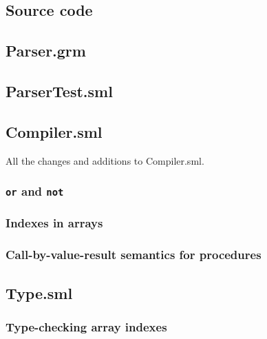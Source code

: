 \documentclass{article}
\begin{document}
\newpage
\begin{appendix}
\section{Source code}
\subsection{Parser.grm}
    

\subsection{ParserTest.sml}
    

\subsection{Compiler.sml}

All the changes and additions to Compiler.sml.

\subsubsection{\texttt{or} and \texttt{not}}
    
\subsubsection{Indexes in arrays}
    
\subsubsection{Call-by-value-result semantics for procedures}
    
    
    

\subsection{Type.sml}
\subsubsection{Type-checking array indexes}
    

\end{appendix}
\end{document}
